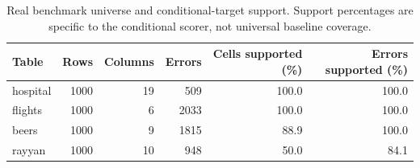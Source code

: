 \begin{table}[t]
\centering\small
\setlength{\tabcolsep}{3.5pt}
\caption{Real benchmark universe and conditional-target support. Support percentages are specific to the conditional scorer, not universal baseline coverage.}
\label{tab:coverage}
\begin{tabular}{lrrrrr}
\toprule
Table & Rows & Columns & Errors & Cells supported (\%) & Errors supported (\%) \\
\midrule
hospital & 1000 & 19 & 509 & 100.0 & 100.0 \\
flights & 1000 & 6 & 2033 & 100.0 & 100.0 \\
beers & 1000 & 9 & 1815 & 88.9 & 100.0 \\
rayyan & 1000 & 10 & 948 & 50.0 & 84.1 \\
\bottomrule
\end{tabular}
\end{table}
